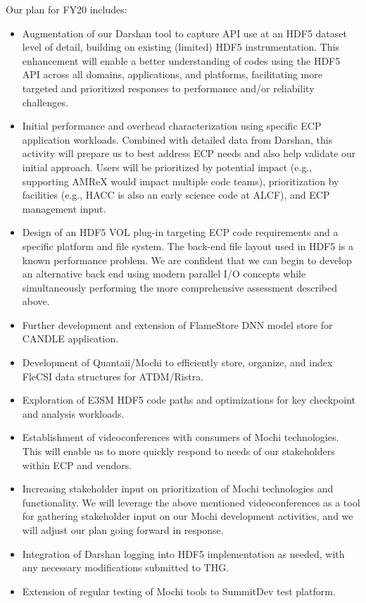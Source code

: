 Our plan for FY20 includes:
\begin{itemize}
\item Augmentation of our Darshan tool to capture API use at an
HDF5 dataset level of detail, building on existing (limited) HDF5
instrumentation. This enhancement will enable a better understanding of
codes using the HDF5 API across all domains, applications, and platforms,
facilitating more targeted and prioritized responses to performance
and/or reliability challenges.

\item Initial performance and overhead characterization using specific
ECP application workloads. Combined with detailed data from Darshan,
this activity will prepare us to best address ECP needs and also help
validate our initial approach. Users will be prioritized by potential
impact (e.g., supporting AMReX would impact multiple code teams),
prioritization by facilities (e.g., HACC is also an early science code
at ALCF), and ECP management input.

\item Design of an HDF5 VOL plug-in targeting ECP code requirements and a
specific platform and file system. The back-end file layout used in HDF5
is a known performance problem. We are confident that we can begin to
develop an alternative back end using modern parallel I/O concepts while
simultaneously performing the more comprehensive assessment described
above.

\item Further development and extension of FlameStore DNN model store
for CANDLE application.

\item	Development of Quantaii/Mochi to efficiently store, organize,
and index FleCSI data structures for ATDM/Ristra.

\item Exploration of E3SM HDF5 code paths and optimizations for key
checkpoint and analysis workloads.

\item Establishment of videoconferences with consumers of Mochi
technologies. This will enable us to more quickly respond to needs of
our stakeholders within ECP and vendors. 

\item Increasing stakeholder input on prioritization of Mochi technologies
and functionality. We will leverage the above mentioned videoconferences
as a tool for gathering stakeholder input on our Mochi development
activities, and we will adjust our plan going forward in response.

\item Integration of Darshan logging into HDF5 implementation as needed,
with any necessary modifications submitted to THG.

\item Extension of regular testing of Mochi tools to SummitDev test platform.
\end{itemize}
